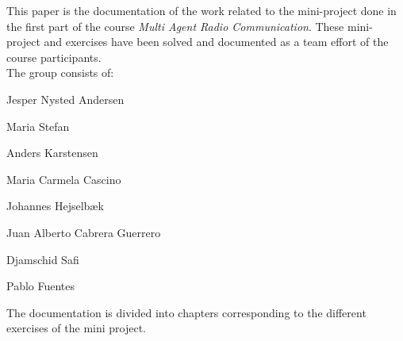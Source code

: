 This paper is the documentation of the work related to the mini-project done in the first part of the course \textit{Multi Agent Radio Communication}. These mini-project and exercises have been solved and documented as a team effort of the course participants.\\

The group consists of:
	\begin{description}
	\item \hspace{4cm} Jesper Nysted Andersen
 	\item \hspace{4cm} Maria Stefan
 	\item \hspace{4cm} Anders Karstensen
 	\item \hspace{4cm} Maria Carmela Cascino
 	\item \hspace{4cm} Johannes Hejselbæk
 	\item \hspace{4cm} Juan Alberto Cabrera Guerrero
 	\item \hspace{4cm} Djamschid Safi
 	\item \hspace{4cm} Pablo Fuentes
	\end{description}

\vspace{2cm}
The documentation is divided into chapters corresponding to the different exercises of the mini project.